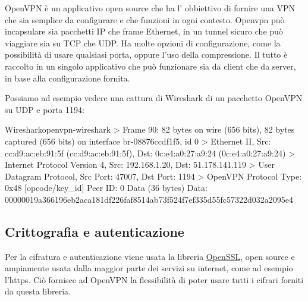 OpenVPN è un applicativo open source che ha l' obbiettivo di fornire una VPN che sia semplice da configurare e che funzioni in ogni contesto. Openvpn può incapsulare sia pacchetti IP che frame Ethernet, in un tunnel sicuro che può viaggiare sia su TCP che UDP. Ha molte opzioni di configurazione, come la possibilità di usare qualsiasi porta, oppure l'uso della compressione. Il tutto è raccolto in un singolo applicativo che può funzionare sia da client che da server, in base alla configurazione fornita.

Possiamo ad esempio vedere una cattura di Wireshark di un pacchetto OpenVPN su UDP e porta 1194:

\begin{bashcode}{Wireshark}{openvpn-wireshark}
> Frame 90: 82 bytes on wire (656 bits), 82 bytes captured (656 bits) on interface br-08876ccdf1f5, id 0
> Ethernet II, Src: cc:d9:ac:eb:91:5f (cc:d9:ac:eb:91:5f), Dst: 0c:e4:a0:27:a9:24 (0c:e4:a0:27:a9:24)
> Internet Protocol Version 4, Src: 192.168.1.20, Dst: 51.178.141.119
> User Datagram Protocol, Src Port: 47007, Dst Port: 1194
> OpenVPN Protocol
Type: 0x48 [opcode/key_id]
Peer ID: 0
Data (36 bytes)
Data: 00000019a366196eb2aca181df226faf8514ab73f524f7ef335d55fc57322d032a2095e4
\end{bashcode}

\subsection{Crittografia e autenticazione}
\label{subsec:auth}

Per la cifratura e autenticazione viene usata la libreria \href{https://en.wikipedia.org/wiki/OpenSSL}{OpenSSL}, open source e ampiamente usata dalla maggior parte dei servizi su internet, come ad esempio l'https. Ciò fornisce ad OpenVPN la flessibilità di poter usare tutti i cifrari forniti da questa libreria.

